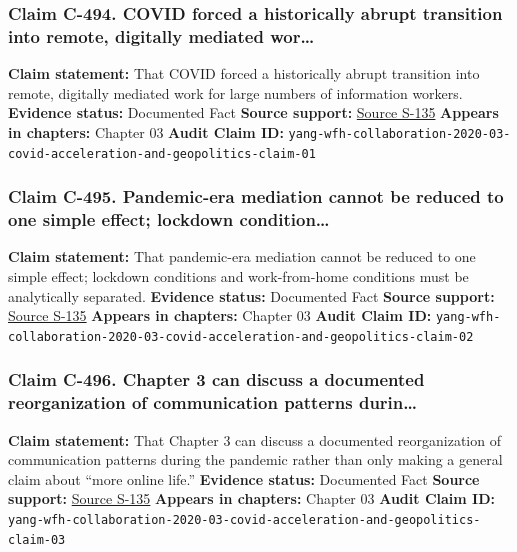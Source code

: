 \documentclass[
  american,
  11pt,
  letterpaper,
]{article}
\begin{document}
\subsubsection{Claim C-494. COVID forced a historically abrupt
transition into remote, digitally mediated
wor\ldots{}}\label{claim-c-494-covid-forced-a-historically-abrupt-transition-into-remote-digitally-mediated-wor}

\textbf{Claim statement:} That COVID forced a historically abrupt
transition into remote, digitally mediated work for large numbers of
information workers. \textbf{Evidence status:} Documented Fact
\textbf{Source support:}
\hyperref[source-s-135-how-work-from-home-affects-collaboration-a-large-scale-study-of-information-workers-in-a-natural-experiment-during-covid-19]{Source
S-135} \textbf{Appears in chapters:} Chapter 03 \textbf{Audit Claim ID:}
\texttt{yang-wfh-collaboration-2020-03-covid-acceleration-and-geopolitics-claim-01}

\subsubsection{Claim C-495. Pandemic-era mediation cannot be reduced to
one simple effect; lockdown
condition\ldots{}}\label{claim-c-495-pandemic-era-mediation-cannot-be-reduced-to-one-simple-effect-lockdown-condition}

\textbf{Claim statement:} That pandemic-era mediation cannot be reduced
to one simple effect; lockdown conditions and work-from-home conditions
must be analytically separated. \textbf{Evidence status:} Documented
Fact \textbf{Source support:}
\hyperref[source-s-135-how-work-from-home-affects-collaboration-a-large-scale-study-of-information-workers-in-a-natural-experiment-during-covid-19]{Source
S-135} \textbf{Appears in chapters:} Chapter 03 \textbf{Audit Claim ID:}
\texttt{yang-wfh-collaboration-2020-03-covid-acceleration-and-geopolitics-claim-02}

\subsubsection{Claim C-496. Chapter 3 can discuss a documented
reorganization of communication patterns
durin\ldots{}}\label{claim-c-496-chapter-3-can-discuss-a-documented-reorganization-of-communication-patterns-durin}

\textbf{Claim statement:} That Chapter 3 can discuss a documented
reorganization of communication patterns during the pandemic rather than
only making a general claim about ``more online life.'' \textbf{Evidence
status:} Documented Fact \textbf{Source support:}
\hyperref[source-s-135-how-work-from-home-affects-collaboration-a-large-scale-study-of-information-workers-in-a-natural-experiment-during-covid-19]{Source
S-135} \textbf{Appears in chapters:} Chapter 03 \textbf{Audit Claim ID:}
\texttt{yang-wfh-collaboration-2020-03-covid-acceleration-and-geopolitics-claim-03}
\end{document}
